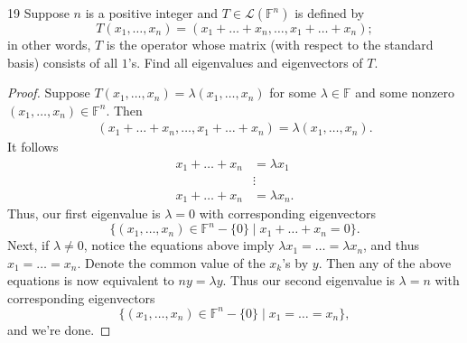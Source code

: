 \documentclass[11pt]{extarticle}
\newenvironment{problem}[1]{\begin{prob*}{#1}{}}{\end{prob*}}
\newcommand{\F}{\mathbb{F}}
\newcommand{\Hom}{\mathcal{L}}
\begin{document}
\begin{problem}{19}
Suppose $n$ is a positive integer and $T\in\Hom(\F^n)$ is defined by 
\begin{equation*}
T(x_1,\dots, x_n) = (x_1 + \dots + x_n, \dots, x_1 + \dots + x_n);
\end{equation*}
in other words, $T$ is the operator whose matrix (with respect to the standard basis) consists of all $1$'s.  Find all eigenvalues and eigenvectors of $T$.  
\end{problem}
\begin{proof}
Suppose $T(x_1,\dots,x_n) = \lambda(x_1,\dots, x_n)$ for some $\lambda\in\F$ and some nonzero $(x_1,\dots, x_n)\in\F^n$.  Then
\begin{align*}
(x_1 + \dots + x_n, \dots, x_1 + \dots + x_n) = \lambda(x_1,\dots, x_n).
\end{align*}
It follows 
\begin{align*}
x_1 + \dots + x_n &= \lambda x_1\\
&\vdots \\
x_1 + \dots + x_n &= \lambda x_n.
\end{align*}
Thus, our first eigenvalue is $\lambda = 0$ with corresponding eigenvectors 
\begin{equation*}
\{(x_1,\dots,x_n)\in\F^n-\{0\}\mid x_1+\dots + x_n = 0\}.  
\end{equation*}
Next, if $\lambda\neq 0$, notice the equations above imply $\lambda x_1 = \dots = \lambda x_n$, and thus $x_1 = \dots = x_n$.  Denote the common value of the $x_k$'s by $y$.  Then any of the above equations is now equivalent to $ny = \lambda y$.  Thus our second eigenvalue is $\lambda = n$ with corresponding eigenvectors 
\begin{equation*}
\{(x_1,\dots, x_n)\in\F^n-\{0\}\mid x_1=\dots=x_n\},
\end{equation*}
and we're done.
\end{proof}
\end{document}

